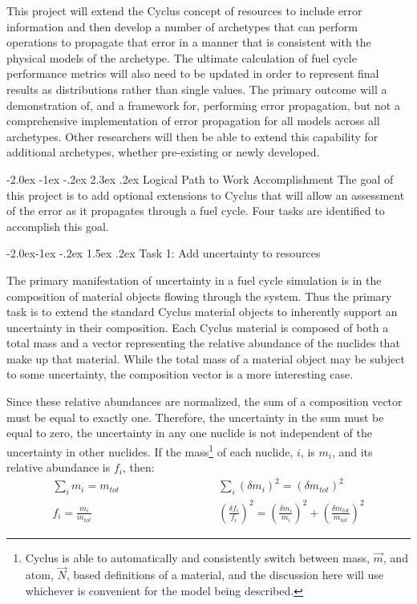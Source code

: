 \documentclass[dvips,11pt]{article}
\makeatletter
\newcommand{\unc}[1]
{ \delta #1 }
\newcommand{\uncsq}[1]
{ \left(\unc{#1}\right)^2 }
\newcommand{\uncratio}[1]
{ \left(\frac{\unc{#1}}{#1}\right) }
\newcommand{\uncratiosq}[1]
{ \uncratio{#1}^2 }
\renewcommand\section{\@startsection {section}{1}{\z@}%
                                   {-2.0ex \@plus -1ex \@minus -.2ex}%
                                   {2.3ex \@plus.2ex}%
                                   {\normalfont\bfseries}}%
\renewcommand\subsection{\@startsection{subsection}{2}{\z@}%
                                     {-2.0ex\@plus -1ex \@minus -.2ex}%
                                     {1.5ex \@plus .2ex}%
                                     {\normalfont\bfseries}}%
\makeatother
\begin{document}
This project
will extend the Cyclus concept of resources to
include error information and then develop a
number of archetypes that can perform operations
to propagate that error in a manner that is 
consistent with the physical models of the 
archetype.
The ultimate calculation of fuel cycle performance
metrics will also need to be updated in order to
represent final results as distributions rather
than single values.  The primary outcome will
a demonstration of, and a
framework for, performing error propagation,
but not a comprehensive implementation of error
propagation for all models across all archetypes.
Other researchers will then be able to extend
this capability for additional archetypes, 
whether pre-existing or newly developed.

\section{Logical Path to Work Accomplishment}
The goal of this project is to add optional
extensions to Cyclus that will allow an assessment
of the error as it propagates through a fuel
cycle.  Four tasks are identified to accomplish
this goal.


\subsection{Task 1: Add uncertainty to resources}

The primary manifestation of uncertainty in a fuel
cycle simulation is in the composition of material
objects flowing through the system.  Thus the
primary task is to extend the standard Cyclus
material objects to inherently support an
uncertainty in their composition.  Each Cyclus
material is composed of both a total mass and a
vector representing the relative abundance of the
nuclides that make up that material.  While the
total mass of a material object may be subject to
some uncertainty, the composition vector is a more
interesting case.

Since these relative abundances are normalized,
the sum of a composition vector must be equal to
exactly one. Therefore, the uncertainty in the sum
must be equal to zero, the uncertainty in any one
nuclide is not independent of the uncertainty in
other nuclides.  If the mass\footnote{Cyclus 
is able to automatically and consistently switch
between mass, $\vec{m}$, and atom, $\vec{N}$, based
 definitions of a
material, and the discussion here will use 
whichever is convenient for the model being 
described.}
 of each nuclide, $i$,
is $m_i$, and its relative abundance is $f_i$,
then:
\begin{align*}
  \sum_i m_i = m_{tot} \qquad\qquad&\qquad\qquad  
       \sum_i \uncsq{m_i} = \uncsq{m_{tot}}\\
  f_i = \frac{m_i}{m_{tot}} \qquad\qquad&\qquad\qquad  
       \uncratiosq{f_i} = \uncratiosq{m_i} + \uncratiosq{m_{tot}}
\end{align*}
\end{document}
